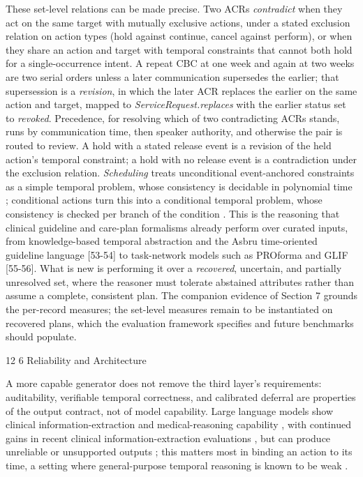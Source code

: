 \documentclass[3p,twocolumn]{elsarticle}
\makeatletter
\renewcommand\section{\@startsection{section}{1}{\z@}%
           {12\p@ \@plus 4\p@ \@minus 4\p@}%
           {6\p@ \@plus 4\p@ \@minus 3\p@}%
           {\normalsize\bfseries\boldmath}}
\makeatother
\begin{document}
These set-level relations can be made precise. Two ACRs \emph{contradict} when they act on the same target with mutually exclusive actions, under a stated exclusion relation on action types (hold against continue, cancel against perform), or when they share an action and target with temporal constraints that cannot both hold for a single-occurrence intent. A repeat CBC at one week and again at two weeks are two serial orders unless a later communication supersedes the earlier; that supersession is a \emph{revision}, in which the later ACR replaces the earlier on the same action and target, mapped to \emph{ServiceRequest.replaces} with the earlier status set to \emph{revoked}. Precedence, for resolving which of two contradicting ACRs stands, runs by communication time, then speaker authority, and otherwise the pair is routed to review. A hold with a stated release event is a revision of the held action's temporal constraint; a hold with no release event is a contradiction under the exclusion relation. \emph{Scheduling} treats unconditional event-anchored constraints as a simple temporal problem, whose consistency is decidable in polynomial time \cite{ref51}; conditional actions turn this into a conditional temporal problem, whose consistency is checked per branch of the condition \cite{ref52}. This is the reasoning that clinical guideline and care-plan formalisms already perform over curated inputs, from knowledge-based temporal abstraction and the Asbru time-oriented guideline language {[}53-54{]} to task-network models such as PROforma and GLIF {[}55-56{]}. What is new is performing it over a \emph{recovered}, uncertain, and partially unresolved set, where the reasoner must tolerate abstained attributes rather than assume a complete, consistent plan. The companion evidence of Section 7 grounds the per-record measures; the set-level measures remain to be instantiated on recovered plans, which the evaluation framework specifies and future benchmarks should populate.

\section{Reliability and Architecture}\label{reliability-and-architecture}

A more capable generator does not remove the third layer's requirements: auditability, verifiable temporal correctness, and calibrated deferral are properties of the output contract, not of model capability. Large language models show clinical information-extraction and medical-reasoning capability \cite{ref38, ref57}, with continued gains in recent clinical information-extraction evaluations \cite{ref58}, but can produce unreliable or unsupported outputs \cite{ref59}; this matters most in binding an action to its time, a setting where general-purpose temporal reasoning is known to be weak \cite{ref48}.
\end{document}
